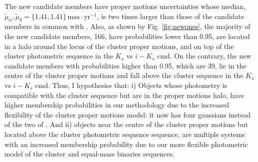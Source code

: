The new candidate members have proper motions uncertainties whose median, $\tilde{\mu}_{\alpha},\tilde{\mu}_{\delta}=\{1.41,1.41\} \,\mathrm{mas\cdot yr^{-1}}$, is two times larger than those of the candidate members in common with \citet{Bouy2015}. Also, as shown by Fig. \ref{fig:newones}, the majority of the new candidate members, 166, have probabilities lower than 0.95, are located in a halo around the locus of the cluster proper motions, and on top of the cluster photometric sequence in the $K_s$ vs $i-K_s$ \gls{cmd}. On the contrary, the new candidate members with probabilities higher than 0.95, which are 39, lie in the centre of the cluster proper motions and fall above the cluster sequence in the $K_s$ vs $i-K_s$ \gls{cmd}. Thus, I hypothesise that: i) Objects whose photometry is compatible with the cluster sequence but are in the proper motions halo, have higher membership probabilities in our methodology due to the increased flexibility of the cluster proper motions model: it now has four gaussians instead of the two of \citet{Bouy2015}. And ii) objects near the centre of the cluster proper motions but located above the cluster photometric sequence sequence, are multiple systems \cite[probably triple systems which can amount to 4\% of the population][]{Duquennoy1991} with an increased membership probability due to our more flexible photometric model of the cluster and equal-mass binaries sequences.

